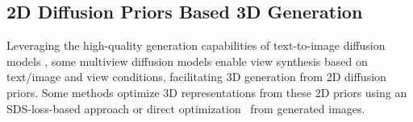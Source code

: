 \subsection{2D Diffusion Priors Based 3D Generation}
\label{sec:related-2d-diffusion}
Leveraging the high-quality generation capabilities of text-to-image diffusion models \cite{rombach2022high,saharia2022photorealistic,betker2023improving}, some multiview diffusion models \cite{liu2023zero,shi2023zero123++,shi2023mvdream,wang2023imagedream,li2023sweetdreamer,long2024wonder3d} enable view synthesis based on text/image and view conditions, facilitating 3D generation from 2D diffusion priors. Some methods optimize 3D representations from these 2D priors using an SDS-loss-based approach \cite{shi2023mvdream,liang2024luciddreamer,poole2022dreamfusion,wang2024prolificdreamer,tang2023dreamgaussian}or direct optimization~\cite{tang2025mvdiffusion++} from generated images. 
